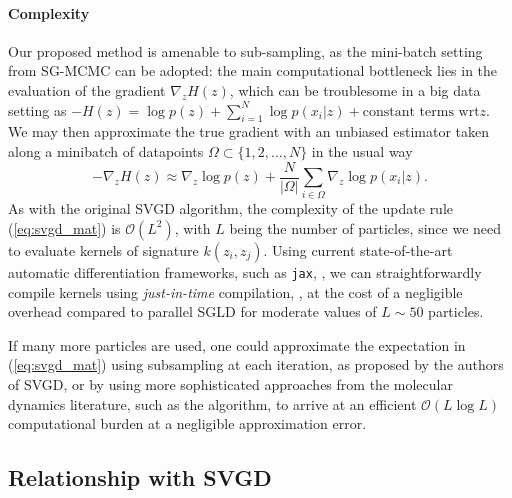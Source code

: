 \paragraph{Complexity}  Our proposed method is amenable to sub-sampling, as the mini-batch setting from SG-MCMC can be adopted: the main computational bottleneck lies in the evaluation of the gradient $\nabla_{{z}} H(z)$, which can be troublesome in a big data setting as $- H(z) = \log p(z) + \sum_{i=1}^N \log p({x}_i | {z}) + \mbox{constant terms wrt} z$.
We may then  approximate the true gradient with an unbiased estimator taken along a minibatch of datapoints $\Omega \subset \lbrace 1, 2, \ldots, N \rbrace$ in the usual way
$$
-\nabla_{{z}} H(z) \approx \nabla_{{z}} \log p({z}) + \frac{N}{| \Omega |} \sum_{i \in \Omega} \nabla_{{z}} \log p({x}_i | {z}).
$$
\noindent As with the original SVGD algorithm, the complexity of the update rule (\ref{eq:svgd_mat}) is $\mathcal{O}(L^2)$, with $L$ being the number of particles, since we need to evaluate kernels of signature $k(z_i, z_j)$. Using current state-of-the-art automatic differentiation frameworks, such as \texttt{jax}, \textcite{jax2018github}, we can straightforwardly compile kernels using \emph{just-in-time} compilation, \textcite{frostig2018compiling}, at the cost of a negligible overhead compared to parallel SGLD for moderate values of $L \sim 50$ particles.

If many more particles are  used, one could approximate the expectation in (\ref{eq:svgd_mat}) using subsampling at each iteration, as proposed by the authors of SVGD, or by using more sophisticated approaches from the molecular dynamics literature, such as the \textcite{barnes1986hierarchical} algorithm, to arrive at an efficient $\mathcal{O}(L \log L)$ computational burden at a negligible approximation error. %


\subsection{Relationship with SVGD}\label{sec:relationship}

